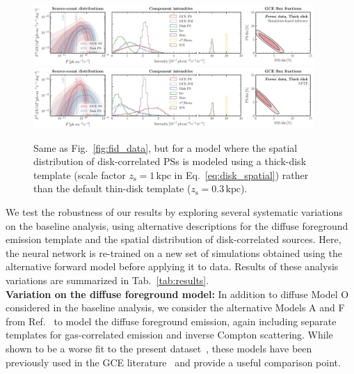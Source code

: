 \documentclass[prd,aps,10pt,nofootinbib,twocolumn,superscriptaddress,preprintnumbers,balancelastpage,longbibliography]{revtex4-1}
\begin{document}
%
\begin{figure}
\centering
\includegraphics[width=0.95\textwidth]{plots/data_fid_sbi_thick.pdf}
\includegraphics[width=0.95\textwidth]{plots/data_fid_nptf_thick.pdf}
\caption{Same as Fig.~\ref{fig:fid_data}, but for a model where the spatial distribution of disk-correlated PSs is modeled using a thick-disk template (scale factor $z_\mathrm{s}=1\,\mathrm{kpc}$ in Eq.~\eqref{eq:disk_spatial}) rather than the default thin-disk template ($z_\mathrm{s}=0.3\,\mathrm{kpc}$).}
\label{fig:fid_data_thick_disk}
\end{figure}
%

We test the robustness of our results by exploring several systematic variations on the baseline analysis, using alternative descriptions for the diffuse foreground emission template and the spatial distribution of disk-correlated sources. Here, the neural network is re-trained on a new set of simulations obtained using the alternative forward model before applying it to \Fermi data. Results of these analysis variations are summarized in Tab.~\ref{tab:results}. \\

\noindent
\textbf{Variation on the diffuse foreground model:}
In addition to diffuse Model O considered in the baseline analysis, we consider the alternative Models A and F from Ref.~\cite{Calore:2014xka} to model the diffuse foreground emission, again including separate templates for gas-correlated emission and inverse Compton scattering. While shown to be a worse fit to the present dataset~\cite{Buschmann:2020adf}, these models have been previously used in the GCE literature~\cite{Buschmann:2020adf,Leane:2020pfc,Leane:2020nmi} and provide a useful comparison point.
\end{document}
